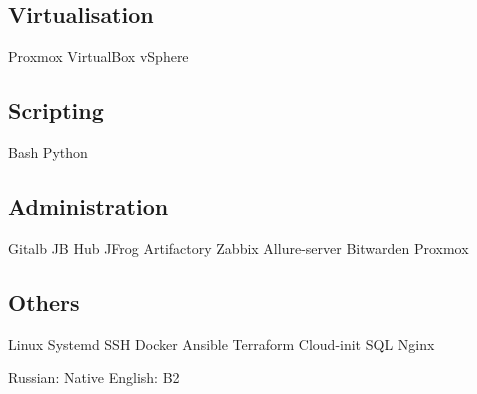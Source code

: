 \documentclass[a4paper]{MagicalCV}
\begin{document}
\begin{minipage}[t]{0.34\textwidth}
\subsection{Virtualisation}
Proxmox \textbullet{} 
VirtualBox \textbullet{} 
vSphere 
\subsection{Scripting}
Bash \textbullet{} 
Python
\subsection{Administration}
Gitalb \textbullet{} 
JB Hub \textbullet{} 
JFrog Artifactory \textbullet{} 
Zabbix \textbullet{} 
Allure-server \textbullet{} 
Bitwarden \textbullet{} 
Proxmox
\subsection{Others}
Linux \textbullet{} 
Systemd \textbullet{} 
SSH \textbullet{} 
Docker \textbullet{} 
Ansible \textbullet{} 
Terraform \textbullet{} 
Cloud-init \textbullet{} 
SQL \textbullet{} 
Nginx
\sectionsep


Russian: Native \textbullet{} English: B2
\sectionsep

\end{minipage} 
\hfill
\end{document}
